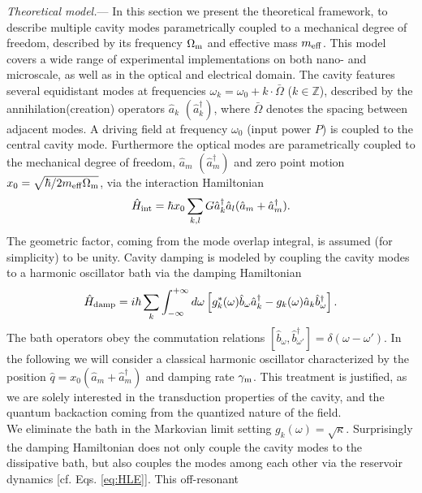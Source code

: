 \documentclass[twocolumn,english,aps,prl,superscriptaddress,showpacs,preprintnumbers]{revtex4}
\begin{document}
\textit{Theoretical model.}--- In this section we present the theoretical
framework, to describe multiple cavity modes parametrically coupled to a mechanical
degree of freedom, described by its frequency $\Omega_{{\rm m}}$ and effective mass
$m_{{\rm eff}}$. This model covers a wide range of experimental
implementations on both nano- and microscale, as well as in the optical
and electrical domain. The cavity features several equidistant 
modes at frequencies $\omega_{k}=\omega_{0}+k\cdot\bar{\Omega}$  ($k\in\mathbb{Z}$),
described by the annihilation(creation) operators $\hat{a}_{k}$ $(\hat{a}_{k}^{\dagger})$,
where $\bar{\Omega}$ denotes the spacing between adjacent modes.
A driving field at frequency $\omega_{0}$ (input power $P$)
is coupled to the central cavity mode. Furthermore the optical modes are
parametrically coupled to the mechanical degree of freedom, $\hat{a}_{m}$
$(\hat{a}_{m}^{\dagger})$ and zero point motion $x_{0}=\sqrt{\hbar/2m_{{\rm eff}}\Omega_{{\rm m}}}$, via the interaction Hamiltonian \cite{Law1995}\begin{equation}
\hat{H}_{{\rm int}}=\hbar x_{0}\sum_{k,l}G\hat{a}_{k}^{\dagger}\hat{a}_{l}(\hat{a}_{m}+\hat{a}_{m}^{\dagger}).\label{eq:Hint}\end{equation}
The geometric factor, coming from the mode overlap integral, is assumed
(for simplicity) to be unity. Cavity
damping is modeled by coupling the cavity modes to a harmonic oscillator
bath via the damping Hamiltonian\begin{equation}
\hat{H}_{{\rm damp}}=i\hbar\sum_{k}\int_{-\infty}^{+\infty}d\omega\left[g_{k}^{\ast}(\omega)\hat{b}_{\omega}\hat{a}_{k}^{\dagger}-g_{k}(\omega)\hat{a}_{k}\hat{b}_{\omega}^{\dagger}\right].\label{eq:Hdamp}\end{equation}
The bath operators obey the commutation relations $[\hat{b}_{\omega},\hat{b}_{\omega'}^{\dagger}]=\delta(\omega-\omega')$.
In the following we will consider a classical harmonic oscillator
characterized by the position $\hat{q}=x_{0}(\hat{a}_{m}+\hat{a}_{m}^{\dagger})$
and damping rate $\gamma_{\rm{m}}$.
This treatment is justified, as we are solely interested in the transduction
properties of the cavity, and the quantum backaction coming from the
quantized nature of the field.\\
We eliminate the bath in the Markovian limit \cite{gardiner_quantum_2000}
setting $g_{k}(\omega)=\sqrt{\kappa}$. Surprisingly
the damping Hamiltonian does not only couple the cavity modes to the
dissipative bath, but also couples the modes among each other via
the reservoir dynamics {[}cf. Eqs. \ref{eq:HLE}{]}. This off-resonant
\end{document}

